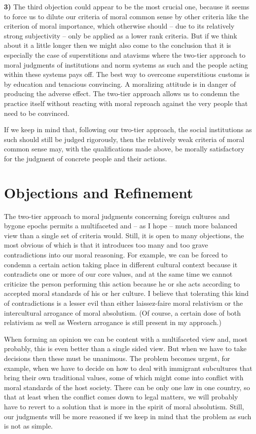 \documentclass[12pt,a4paper,ngerman]{article}
\begin{document}
{\bf 3)} The third objection could appear to be the most crucial one,
because it seems to force us to dilute our criteria of moral common
sense by other criteria like the criterion of moral importance, which
otherwise should -- due to its relatively strong subjectivity -- only be
applied as a lower rank criteria. But if we think about it a little
longer then we might also come to the conclusion that it is especially
the case of superstitions and atavisms where the two-tier approach to
moral judgments of institutions and norm systems as such and the people acting
within these systems pays off. The best way to overcome superstitious
customs is by education and tenacious convincing. A moralizing attitude
is in danger of producing the adverse effect. The two-tier approach
allows us to condemn the practice itself without reacting with moral
reproach against the very people that need to be convinced. 

If we keep in mind that, following our two-tier approach,
the social institutions as such should still be judged rigorously, then
the relatively weak criteria of moral common sense may, with the
qualifications made above, be morally satisfactory for the judgment of
concrete people and their actions.

\section{Objections and Refinement}

The two-tier approach to moral judgments concerning foreign cultures
and bygone epochs permits a multifaceted and -- as I hope -- much more
balanced view than a single set of criteria would. Still, it is open to
many objections, the most obvious of which is that it introduces too
many and too grave contradictions into our moral reasoning. For example,
we can be forced to condemn a certain action taking place in different
cultural context because it contradicts one or more of our core
values, and at the same time we cannot criticize the person performing
this action because he or she acts according to accepted moral standards
of his or her culture. I believe that tolerating this kind of
contradictions is a lesser evil than either laissez-faire moral
relativism or the intercultural arrogance of moral absolutism. (Of
course, a certain dose of both relativism as well as Western arrogance
is still present in my approach.)

When forming an opinion we can be content with a
multifaceted view and, most probably, this is even better than a single
sided view. But when we have to take decisions then these must be
unanimous. The problem becomes urgent, for example, when we have to
decide on how to deal with immigrant subcultures that bring their own
traditional values, some of which might come into conflict with moral
standards of the host society. There can be only one law in one country,
so that at least when the conflict comes down to legal matters, we will
probably have to revert to a solution that is more in the spirit of
moral absolutism. Still, our judgments will be more reasoned if we keep
in mind that the problem as such is not as simple. 
\end{document}
